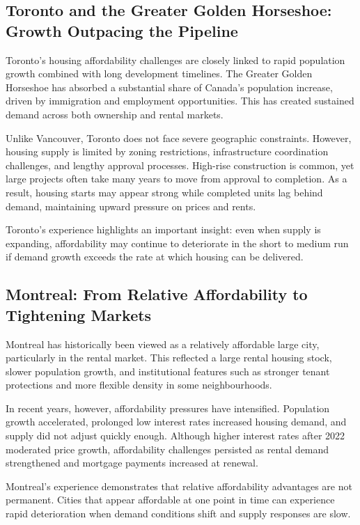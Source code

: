 \documentclass[11pt]{article}
\begin{document}
\subsection*{Toronto and the Greater Golden Horseshoe: Growth Outpacing the Pipeline}

Toronto’s housing affordability challenges are closely linked to rapid population growth combined with long development timelines. The Greater Golden Horseshoe has absorbed a substantial share of Canada’s population increase, driven by immigration and employment opportunities. This has created sustained demand across both ownership and rental markets.

Unlike Vancouver, Toronto does not face severe geographic constraints. However, housing supply is limited by zoning restrictions, infrastructure coordination challenges, and lengthy approval processes. High-rise construction is common, yet large projects often take many years to move from approval to completion. As a result, housing starts may appear strong while completed units lag behind demand, maintaining upward pressure on prices and rents.

Toronto’s experience highlights an important insight: even when supply is expanding, affordability may continue to deteriorate in the short to medium run if demand growth exceeds the rate at which housing can be delivered.

\subsection*{Montreal: From Relative Affordability to Tightening Markets}

Montreal has historically been viewed as a relatively affordable large city, particularly in the rental market. This reflected a large rental housing stock, slower population growth, and institutional features such as stronger tenant protections and more flexible density in some neighbourhoods.

In recent years, however, affordability pressures have intensified. Population growth accelerated, prolonged low interest rates increased housing demand, and supply did not adjust quickly enough. Although higher interest rates after 2022 moderated price growth, affordability challenges persisted as rental demand strengthened and mortgage payments increased at renewal.

Montreal’s experience demonstrates that relative affordability advantages are not permanent. Cities that appear affordable at one point in time can experience rapid deterioration when demand conditions shift and supply responses are slow.
\end{document}
